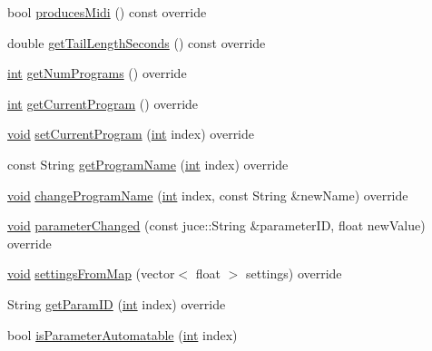 \begin{DoxyCompactItemize}
\item 
bool \hyperlink{class_audealizeeq_audio_processor_a784691486ca80271a1f2fcee9ad32542}{produces\+Midi} () const  override
\item 
double \hyperlink{class_audealizeeq_audio_processor_a2c3fb8c06b4ffe89c921b961fa73af25}{get\+Tail\+Length\+Seconds} () const  override
\item 
\hyperlink{tk_8h_a83f82f76e7fed06f4c49d2db94028a6d}{int} \hyperlink{class_audealizeeq_audio_processor_a11bd93cafb127cdbc624e16f62582d52}{get\+Num\+Programs} () override
\item 
\hyperlink{tk_8h_a83f82f76e7fed06f4c49d2db94028a6d}{int} \hyperlink{class_audealizeeq_audio_processor_a5cb00c25aa26c2b65b6a848a415342bd}{get\+Current\+Program} () override
\item 
\hyperlink{tk_8h_aba408b7cd755a96426e004c015f5de8e}{void} \hyperlink{class_audealizeeq_audio_processor_ab6d138c59bb721764c33d4af3f26e97e}{set\+Current\+Program} (\hyperlink{tk_8h_a83f82f76e7fed06f4c49d2db94028a6d}{int} index) override
\item 
const String \hyperlink{class_audealizeeq_audio_processor_adce52ddadf23a6731b91685eb2693ca1}{get\+Program\+Name} (\hyperlink{tk_8h_a83f82f76e7fed06f4c49d2db94028a6d}{int} index) override
\item 
\hyperlink{tk_8h_aba408b7cd755a96426e004c015f5de8e}{void} \hyperlink{class_audealizeeq_audio_processor_aa77d0be3fce3b96cd822902b55e2d984}{change\+Program\+Name} (\hyperlink{tk_8h_a83f82f76e7fed06f4c49d2db94028a6d}{int} index, const String \&new\+Name) override
\item 
\hyperlink{tk_8h_aba408b7cd755a96426e004c015f5de8e}{void} \hyperlink{class_audealizeeq_audio_processor_a25c85696329c21a201963733bc46d957}{parameter\+Changed} (const juce\+::\+String \&parameter\+ID, float new\+Value) override
\item 
\hyperlink{tk_8h_aba408b7cd755a96426e004c015f5de8e}{void} \hyperlink{class_audealizeeq_audio_processor_adda624ec0e28dbc41777aa76ed9ce974}{settings\+From\+Map} (vector$<$ float $>$ settings) override
\item 
String \hyperlink{class_audealizeeq_audio_processor_a692e0576747a20bc080b971dccd84241}{get\+Param\+ID} (\hyperlink{tk_8h_a83f82f76e7fed06f4c49d2db94028a6d}{int} index) override
\item 
bool \hyperlink{class_audealizeeq_audio_processor_ab1137d76de3de26b559e5b3b9c4f584b}{is\+Parameter\+Automatable} (\hyperlink{tk_8h_a83f82f76e7fed06f4c49d2db94028a6d}{int} index)
\end{DoxyCompactItemize}
